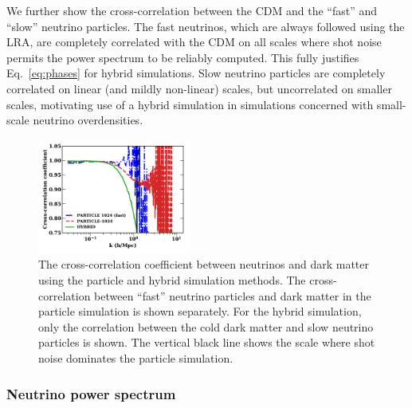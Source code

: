 \documentclass[useAMS, usenatbib]{mnras}
\begin{document}
We further show the cross-correlation between the CDM and the ``fast'' and ``slow'' neutrino particles. The fast neutrinos, which are always followed using the LRA, are completely correlated with the CDM on all scales where shot noise permits the power spectrum to be reliably computed. This fully justifies Eq.~\eqref{eq:phases} for hybrid simulations. Slow neutrino particles are completely correlated on linear (and mildly non-linear) scales, but uncorrelated on smaller scales, motivating use of a hybrid simulation in simulations concerned with small-scale neutrino overdensities.

\begin{figure}
\includegraphics[width=0.45\textwidth]{nuplots/corr_coeff-1.pdf}
  \caption{The cross-correlation coefficient between neutrinos and dark matter using the particle and hybrid simulation methods. The cross-correlation between ``fast'' neutrino particles and dark matter in the particle simulation is shown separately. For the hybrid simulation, only the correlation between the cold dark matter and slow neutrino particles is shown. The vertical black line shows the scale where shot noise dominates the particle simulation.
  }
  \label{fig:cross-corr}
\end{figure}


\subsubsection{Neutrino power spectrum}
\end{document}
